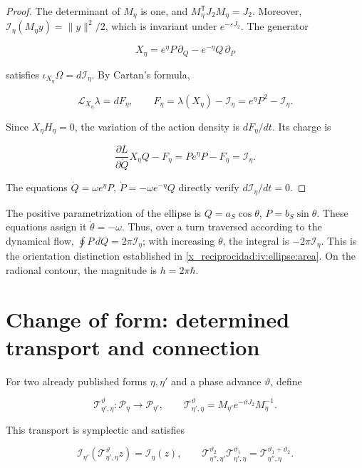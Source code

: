 \begin{proof}
The determinant of \(M_\eta\) is one, and \(M_\eta^{\mathsf T}J_2M_\eta=J_2\). Moreover, \(\mathcal I_\eta(M_\eta y)=\|y\|^2/2\), which is invariant under \(e^{-\varepsilon J_2}\).
The generator

\[
X_\eta=e^\eta P\,\partial_Q-e^{-\eta}Q\,\partial_P
\]

satisfies \(\iota_{X_\eta}\Omega=d\mathcal I_\eta\). By Cartan's formula,

\[
\mathcal L_{X_\eta}\lambda=dF_\eta,\qquad
F_\eta=\lambda(X_\eta)-\mathcal I_\eta=e^\eta P^2-\mathcal I_\eta.
\]

Since \(X_\eta H_\eta=0\), the variation of the action density is \(dF_\eta/dt\). Its charge is

\[
\frac{\partial L}{\partial\dot Q}X_\eta Q-F_\eta
=Pe^\eta P-F_\eta=\mathcal I_\eta.
\]

The equations \(\dot Q=\omega e^\eta P\), \(\dot P=-\omega e^{-\eta}Q\) directly verify \(d\mathcal I_\eta/dt=0\).
\end{proof}

The positive parametrization of the ellipse is \(Q=a_S\cos\theta\), \(P=b_S\sin\theta\). These equations assign it \(\dot\theta=-\omega\). Thus, over a turn traversed according to the dynamical flow, \(\oint P\,dQ=2\pi\mathcal I_\eta\); with increasing \(\theta\), the integral is \(-2\pi\mathcal I_\eta\). This is the orientation distinction established in \cref{x_reciprocidad:iv:ellipse:area}. On the radional contour, the magnitude is \(h=2\pi\hbar\).

\section{Change of form: determined transport and connection}

For two already published forms \(\eta,\eta'\) and a phase advance \(\vartheta\), define

\begin{equation}
\mathcal T_{\eta',\eta}^{\vartheta}:\mathcal P_\eta\to\mathcal P_{\eta'},
\qquad
\mathcal T_{\eta',\eta}^{\vartheta}
=M_{\eta'}e^{-\vartheta J_2}M_\eta^{-1}.
\label{x_reciprocidad:nuc07:eq:4}
\end{equation}

\begin{proposition}
This transport is symplectic and satisfies

\begin{equation}
\mathcal I_{\eta'}(\mathcal T_{\eta',\eta}^{\vartheta}z)
=\mathcal I_\eta(z),\qquad
\mathcal T_{\eta'',\eta'}^{\vartheta_2}
\mathcal T_{\eta',\eta}^{\vartheta_1}
=\mathcal T_{\eta'',\eta}^{\vartheta_1+\vartheta_2}.
\label{x_reciprocidad:nuc07:eq:5}
\end{equation}
\end{proposition}

